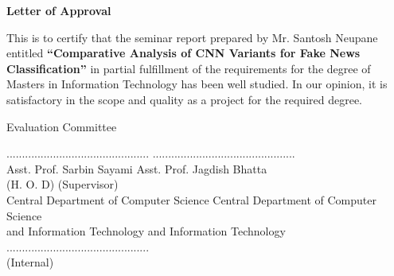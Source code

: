 \begin{titlepage}
    \centerline{\large\textbf{Letter of Approval}}
    
    \vspace{1cm}
    
    This is to certify that the seminar report prepared by Mr. Santosh Neupane entitled \textbf{“Comparative Analysis of CNN Variants for Fake News Classification”} in partial fulfillment of the requirements for the 
    degree of Masters in Information Technology has been well 
    studied. In our opinion, it is satisfactory in the scope and quality as a project for the required 
    degree.
    
    \vspace{1.5cm}
    
    \centerline{Evaluation Committee}
    
    \vspace{2cm}
    
    \noindent
    
    \begin{center} 
        .............................................. \hspace{3.5cm} ..............................................\\
        Asst. Prof. Sarbin Sayami \hspace{4cm} Asst. Prof. Jagdish Bhatta \\
        (H. O. D)  \hspace{7cm}(Supervisor)\\
        Central Department of Computer Science \hfill
        Central Department of Computer Science \\
        and Information Technology \hspace{3.5cm} and Information Technology\\
        
        \vspace{4cm}
        ..............................................\\
        (Internal)   
        
    \end{center}
\end{titlepage}